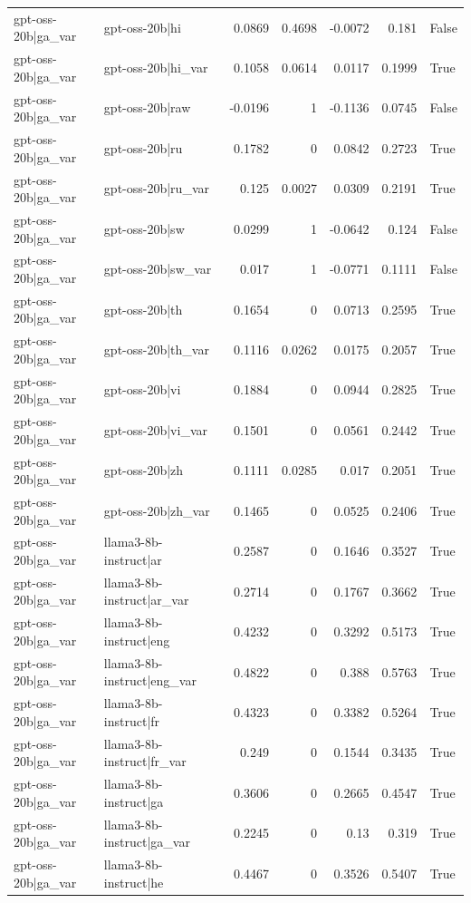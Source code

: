 \begin{table}
\begin{tabular}{l l r r r r l}
gpt-oss-20b|ga_var & gpt-oss-20b|hi & 0.0869 & 0.4698 & -0.0072 & 0.181 & False \\
gpt-oss-20b|ga_var & gpt-oss-20b|hi_var & 0.1058 & 0.0614 & 0.0117 & 0.1999 & True \\
gpt-oss-20b|ga_var & gpt-oss-20b|raw & -0.0196 & 1 & -0.1136 & 0.0745 & False \\
gpt-oss-20b|ga_var & gpt-oss-20b|ru & 0.1782 & 0 & 0.0842 & 0.2723 & True \\
gpt-oss-20b|ga_var & gpt-oss-20b|ru_var & 0.125 & 0.0027 & 0.0309 & 0.2191 & True \\
gpt-oss-20b|ga_var & gpt-oss-20b|sw & 0.0299 & 1 & -0.0642 & 0.124 & False \\
gpt-oss-20b|ga_var & gpt-oss-20b|sw_var & 0.017 & 1 & -0.0771 & 0.1111 & False \\
gpt-oss-20b|ga_var & gpt-oss-20b|th & 0.1654 & 0 & 0.0713 & 0.2595 & True \\
gpt-oss-20b|ga_var & gpt-oss-20b|th_var & 0.1116 & 0.0262 & 0.0175 & 0.2057 & True \\
gpt-oss-20b|ga_var & gpt-oss-20b|vi & 0.1884 & 0 & 0.0944 & 0.2825 & True \\
gpt-oss-20b|ga_var & gpt-oss-20b|vi_var & 0.1501 & 0 & 0.0561 & 0.2442 & True \\
gpt-oss-20b|ga_var & gpt-oss-20b|zh & 0.1111 & 0.0285 & 0.017 & 0.2051 & True \\
gpt-oss-20b|ga_var & gpt-oss-20b|zh_var & 0.1465 & 0 & 0.0525 & 0.2406 & True \\
gpt-oss-20b|ga_var & llama3-8b-instruct|ar & 0.2587 & 0 & 0.1646 & 0.3527 & True \\
gpt-oss-20b|ga_var & llama3-8b-instruct|ar_var & 0.2714 & 0 & 0.1767 & 0.3662 & True \\
gpt-oss-20b|ga_var & llama3-8b-instruct|eng & 0.4232 & 0 & 0.3292 & 0.5173 & True \\
gpt-oss-20b|ga_var & llama3-8b-instruct|eng_var & 0.4822 & 0 & 0.388 & 0.5763 & True \\
gpt-oss-20b|ga_var & llama3-8b-instruct|fr & 0.4323 & 0 & 0.3382 & 0.5264 & True \\
gpt-oss-20b|ga_var & llama3-8b-instruct|fr_var & 0.249 & 0 & 0.1544 & 0.3435 & True \\
gpt-oss-20b|ga_var & llama3-8b-instruct|ga & 0.3606 & 0 & 0.2665 & 0.4547 & True \\
gpt-oss-20b|ga_var & llama3-8b-instruct|ga_var & 0.2245 & 0 & 0.13 & 0.319 & True \\
gpt-oss-20b|ga_var & llama3-8b-instruct|he & 0.4467 & 0 & 0.3526 & 0.5407 & True \\

\end{tabular}
\end{table}
